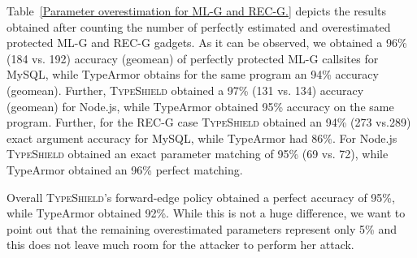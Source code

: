 \begin{table}[H]
\centering 
{}
\caption{Parameter overestimation for ML-G and REC-G.}
\label{Parameter overestimation for ML-G and REC-G.}

\vspace{-.5cm}
\end{table}
Table~\ref{Parameter overestimation for ML-G and REC-G.} depicts the results obtained
after counting the number of perfectly estimated and overestimated protected ML-G and 
REC-G gadgets. As it can be observed, we obtained a
96\% (184 vs. 192) accuracy (geomean) of perfectly protected ML-G callsites for MySQL, while
TypeArmor obtains for the same program an 94\% accuracy (geomean). Further,
\textsc{TypeShield} obtained a 97\% (131 vs. 134) accuracy (geomean) for Node.js, while TypeArmor
obtained 95\% accuracy on the same program.
Further, for the REC-G case \textsc{TypeShield} obtained an
94\% (273 vs.289) exact argument accuracy for MySQL, while TypeArmor had 86\%.
For Node.js \textsc{TypeShield} obtained an exact parameter 
matching of 95\% (69 vs. 72), while TypeArmor obtained an 96\% perfect matching.

Overall \textsc{TypeShield}'s forward-edge policy obtained a perfect accuracy 
of 95\%, while TypeArmor obtained 92\%. While this is not a huge difference,
we want to point out that the remaining overestimated parameters represent only 5\% and this 
does not leave much room for the attacker to perform her attack.

